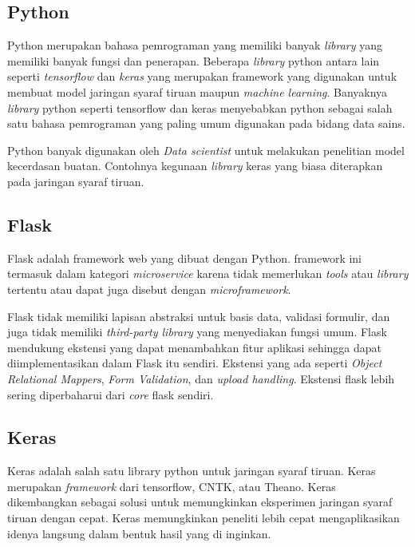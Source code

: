 \documentclass[./skripsi.tex]{subfiles}
\begin{document}
\subsection{Python}
\par Python merupakan bahasa pemrograman yang memiliki banyak \textit{library} yang memiliki banyak fungsi dan penerapan. Beberapa \textit{library} python antara lain seperti \textit{tensorflow} dan \textit{keras} yang merupakan framework yang digunakan untuk membuat model jaringan syaraf tiruan maupun \textit{machine learning}. Banyaknya \textit{library} python seperti tensorflow dan keras menyebabkan python sebagai salah satu bahasa pemrograman yang paling umum digunakan pada bidang data sains. 
\par Python banyak digunakan oleh \textit{Data scientist} untuk melakukan penelitian model kecerdasan buatan. Contohnya kegunaan \textit{library} keras yang biasa diterapkan pada jaringan syaraf tiruan.
\subsection{Flask}\label{bab2:flask}
\par Flask adalah framework web yang dibuat dengan Python. framework ini termasuk dalam kategori \textit{microservice} karena tidak memerlukan \textit{tools} atau \textit{library} tertentu atau dapat juga disebut dengan \textit{microframework}.
\par Flask tidak memiliki lapisan abstraksi untuk basis data, validasi formulir, dan juga tidak memiliki \textit{third-party library} yang menyediakan fungsi umum. Flask mendukung ekstensi yang dapat menambahkan fitur aplikasi sehingga dapat diimplementasikan dalam Flask itu sendiri. Ekstensi yang ada seperti \textit{Object Relational Mappers}, \textit{Form Validation}, dan \textit{upload handling}. Ekstensi flask lebih sering diperbaharui dari \textit{core} flask sendiri.
\subsection{Keras}
\par Keras adalah salah satu library python untuk jaringan syaraf tiruan. Keras merupakan \textit{framework} dari tensorflow, CNTK, atau Theano. Keras dikembangkan sebagai solusi untuk memungkinkan eksperimen jaringan syaraf tiruan dengan cepat. Keras memungkinkan peneliti lebih cepat mengaplikasikan idenya langsung dalam bentuk hasil yang di inginkan.
\end{document}
